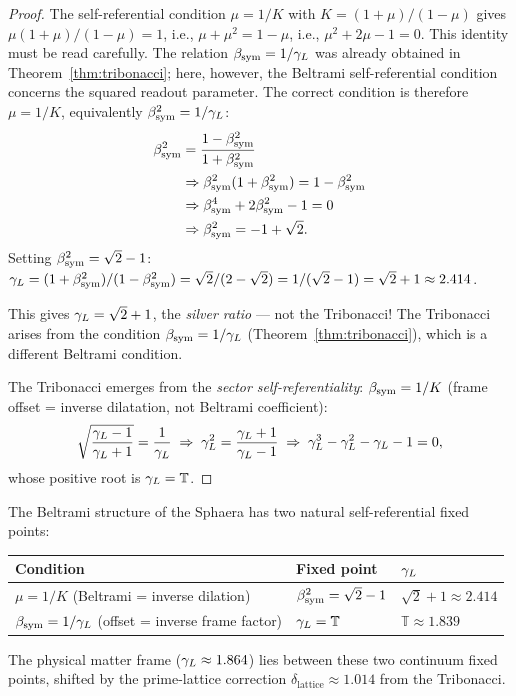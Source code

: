 \begin{proof}
The self-referential condition $\mu = 1/K$ with $K = (1+\mu)/(1-\mu)$
gives $\mu(1+\mu)/(1-\mu) = 1$, i.e.,
$\mu + \mu^2 = 1 - \mu$, i.e., $\mu^2 + 2\mu - 1 = 0$.
This identity must be read carefully. The relation $\beta_{\mathrm{sym}} = 1/\gamma_L$ was already obtained in Theorem~\ref{thm:tribonacci}; here, however, the Beltrami self-referential condition concerns the squared readout parameter. The correct condition is therefore $\mu = 1/K$, equivalently $\beta_{\mathrm{sym}}^2 = 1/\gamma_L$:
\[
\begin{aligned}
\beta_{\mathrm{sym}}^2 &= \frac{1-\beta_{\mathrm{sym}}^2}{1+\beta_{\mathrm{sym}}^2}\\
&\Rightarrow \beta_{\mathrm{sym}}^2(1+\beta_{\mathrm{sym}}^2)=1-\beta_{\mathrm{sym}}^2\\
&\Rightarrow \beta_{\mathrm{sym}}^4+2\beta_{\mathrm{sym}}^2-1=0\\
&\Rightarrow \beta_{\mathrm{sym}}^2=-1+\sqrt{2}.
\end{aligned}
\]
Setting $\beta_{\mathrm{sym}}^2 = \sqrt{2}-1$: $\gamma_L = (1+\beta_{\mathrm{sym}}^2)/(1-\beta_{\mathrm{sym}}^2) = \sqrt{2}/(2-\sqrt{2}) = 1/(\sqrt{2}-1) = \sqrt{2}+1 \approx 2.414$.

This gives $\gamma_L = \sqrt{2}+1$, the \emph{silver ratio} --- not the Tribonacci!
The Tribonacci arises from the condition $\beta_{\mathrm{sym}} = 1/\gamma_L$ (Theorem~\ref{thm:tribonacci}),
which is a different Beltrami condition.

\medskip
The Tribonacci emerges from the \emph{sector self-referentiality}:
$\beta_{\mathrm{sym}} = 1/K$ (frame offset = inverse dilatation, not Beltrami coefficient):
\[
  \sqrt{\frac{\gamma_L-1}{\gamma_L+1}} = \frac{1}{\gamma_L}
  \;\Rightarrow\;
  \gamma_L^2 = \frac{\gamma_L+1}{\gamma_L-1}
  \;\Rightarrow\;
  \gamma_L^3 - \gamma_L^2 - \gamma_L - 1 = 0,
\]
whose positive root is $\gamma_L = \mathbb{T}$.
\end{proof}

\begin{remark}
\label{rem:two-fixed-points}
The Beltrami structure of the Sphaera has two natural self-referential
fixed points:
\begin{center}
\renewcommand{\arraystretch}{1.3}
\begin{tabular}{lll}
\toprule
Condition & Fixed point & $\gamma_L$ \\
\midrule
$\mu = 1/K$ (Beltrami = inverse dilation) & $\beta_{\mathrm{sym}}^2 = \sqrt{2}-1$ & $\sqrt{2}+1 \approx 2.414$ \\
$\beta_{\mathrm{sym}} = 1/\gamma_L$ (offset = inverse frame factor) & $\gamma_L = \mathbb{T}$ & $\mathbb{T} \approx 1.839$ \\
\bottomrule
\end{tabular}
\end{center}
The physical matter frame ($\gamma_L \approx 1.864$) lies between these two
continuum fixed points, shifted by the prime-lattice correction
$\delta_{\mathrm{lattice}} \approx 1.014$ from the Tribonacci.
\end{remark}

